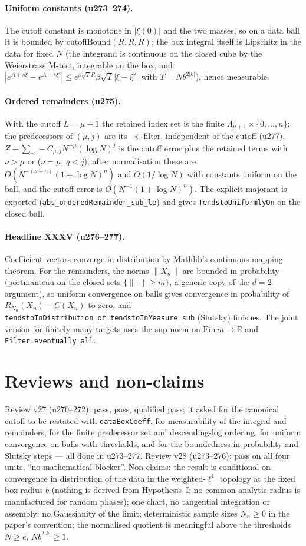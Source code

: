 \documentclass[11pt]{article}
\begin{document}
\paragraph{Uniform constants (u273--274).} The cutoff constant is monotone in $|\xi(0)|$ and the two
masses, so on a data ball it is bounded by $\mathrm{cutoffBound}(R,R,R)$; the box integral itself is
Lipschitz in the data for fixed $N$ (the integrand is continuous on the closed cube by the Weierstrass
M-test, integrable on the box, and $|e^{A+s\xi}-e^{A+s\xi'}|\le e^{\beta\sqrt TR}\beta\sqrt T|\xi-\xi'|$
with $T=Nb^{2|k|}$), hence measurable.
\paragraph{Ordered remainders (u275).} With the cutoff $L=\mu+1$ the retained index set is the finite
$\Lambda_{\mu+1}\times\{0,\dots,n\}$; the predecessors of $(\mu,j)$ are its $\prec$-filter, independent
of the cutoff (u277). $Z-\sum_\prec-C_{\mu,j}N^{-\mu}(\log N)^j$ is the cutoff error plus the retained
terms with $\nu>\mu$ or ($\nu=\mu$, $q<j$); after normalisation these are
$O(N^{-(\nu-\mu)}(1+\log N)^n)$ and $O(1/\log N)$ with constants uniform on the ball, and the cutoff error
is $O(N^{-1}(1+\log N)^n)$. The explicit majorant is exported (\texttt{abs\_orderedRemainder\_sub\_le})
and gives \texttt{TendstoUniformlyOn} on the closed ball.
\paragraph{Headline XXXV (u276--277).} Coefficient vectors converge in distribution by Mathlib's
continuous mapping theorem. For the remainders, the norms $\|X_n\|$ are bounded in probability
(portmanteau on the closed sets $\{\|\cdot\|\ge m\}$, a generic copy of the $d=2$ argument), so uniform
convergence on balls gives convergence in probability of $R_{N_n}(X_n)-C(X_n)$ to zero, and
\texttt{tendstoInDistribution\_of\_tendstoInMeasure\_sub} (Slutsky) finishes. The joint version for
finitely many targets uses the sup norm on $\mathrm{Fin}\,m\to\mathbb R$ and
\texttt{Filter.eventually\_all}.

\section{Reviews and non-claims}
Review v27 (u270--272): pass, pass, qualified pass; it asked for the canonical cutoff to be restated
with \texttt{dataBoxCoeff}, for measurability of the integral and remainders, for the finite predecessor
set and descending-log ordering, for uniform convergence on balls with thresholds, and for the
boundedness-in-probability and Slutsky steps --- all done in u273--277. Review v28 (u273--276): pass on
all four units, ``no mathematical blocker''. Non-claims: the result is conditional on convergence in
distribution of the data in the weighted-$\ell^1$ topology at the fixed box radius $b$ (nothing is
derived from Hypothesis~I; no common analytic radius is manufactured for random phases); one chart, no
tangential integration or assembly; no Gaussianity of the limit; deterministic sample sizes
$N_n\ge0$ in the paper's convention; the normalised quotient is meaningful above the thresholds
$N\ge e$, $Nb^{2|k|}\ge1$.
\end{document}
